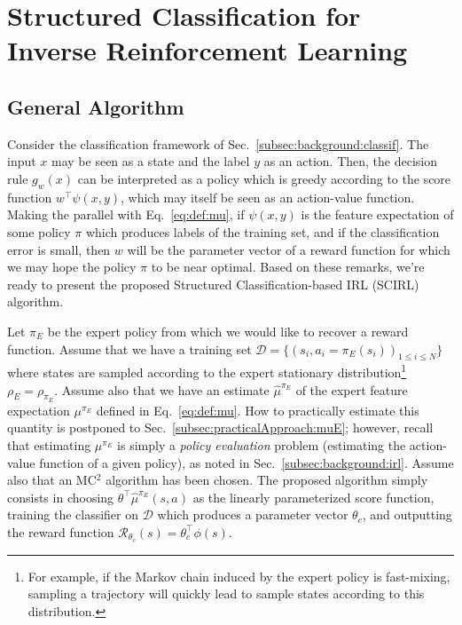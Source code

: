 \documentclass[english,utf8]{./hermes-journal}
\newcommand{\R}{\mathcal{R}}
\newcommand{\D}{\mathcal{D}}
\begin{document}
\section{Structured Classification for Inverse Reinforcement
Learning} \label{sec:scirl}

\subsection{General Algorithm}
\label{subsec:scirl:algo}

Consider the classification framework of
Sec.~\ref{subsec:background:classif}. The input $x$ may be seen as a
state and the label $y$ as an action. Then, the decision rule
$g_w(x)$ can be interpreted as a policy which is greedy according to
the score function $w^\top \psi(x,y)$, which may itself be seen as
an action-value function. Making the parallel with
Eq.~\eqref{eq:def:mu}, if $\psi(x,y)$ is the feature expectation of
some policy $\pi$ which produces labels of the training set, and if
the classification error is small, then $w$ will be the parameter
vector of a reward function for which we may hope the policy $\pi$
to be near optimal. Based on these remarks, we're ready to present
the proposed Structured Classification-based IRL (SCIRL) algorithm.

Let $\pi_E$ be the expert policy from which we would like to recover
a reward function. Assume that we have a training set $\D =
\{(s_i,a_i=\pi_E(s_i))_{1\leq i\leq N}\}$ where states are sampled
according to the expert stationary distribution\footnote{For
example, if the Markov chain induced by the expert policy is
fast-mixing, sampling a trajectory will quickly lead to sample
states according to this distribution.} $\rho_E = \rho_{\pi_E}$.
Assume also that we have an estimate $\hat{\mu}^{\pi_E}$ of the
expert feature expectation $\mu^{\pi_E}$ defined in
Eq.~\eqref{eq:def:mu}. How to practically estimate this quantity is
postponed to Sec.~\ref{subsec:practicalApproach:muE}; however,
recall that estimating $\mu^{\pi_E}$ is simply a \emph{policy
evaluation} problem (estimating the action-value function of a given
policy), as noted in Sec.~\ref{subsec:background:irl}. Assume also
that an MC$^2$ algorithm has been chosen. The proposed algorithm
simply consists in choosing $\theta^\top\hat{\mu}^{\pi_E}(s,a)$ as
the linearly parameterized score function, training the classifier
on $\D$ which produces a parameter vector $\theta_c$, and outputting
the reward function $\R_{\theta_c}(s) = \theta_c^\top \phi(s)$.
\end{document}
